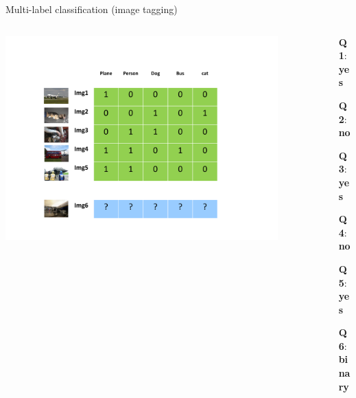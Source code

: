\documentclass[]{beamer}
\begin{document}
\begin{frame}
{Multi-label classification (image tagging)}

\begin{columns}

\begin{column}{9cm}
\includegraphics[width=0.9\textwidth,trim = 0 0 100 60,clip]{Dimitris_figures/MLC_image_classfication2.pdf}
\end{column}

\begin{column}{7cm}
\begin{itemize}
\itemindent=2pt    \item [\textbf{Q1}:] \textbf{yes}
\itemindent=2pt    \item [\textbf{Q2}:] \textbf{no}
\itemindent=2pt    \item [\textbf{Q3}:] \textbf{yes}
\itemindent=2pt    \item [\textbf{Q4}:] \textbf{no}
\itemindent=2pt    \item [\textbf{Q5}:] \textbf{yes}
\itemindent=2pt    \item [\textbf{Q6}:]  \textbf{binary}
\end{itemize}
\end{column}

\end{columns}
\end{frame}
\end{document}
